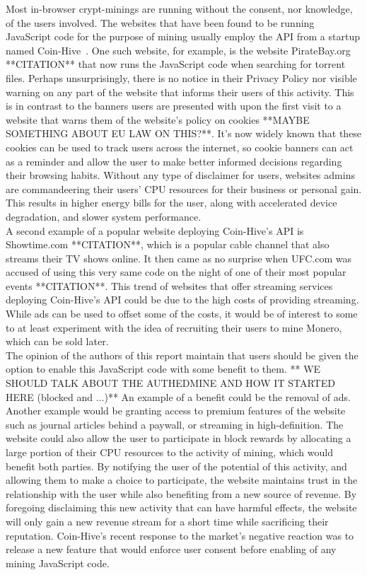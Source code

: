 Most in-browser crypt-minings are running without the consent, nor knowledge, of the users involved. The websites that have been found to be running JavaScript code for the purpose of mining usually employ the API from a startup named Coin-Hive~\cite{coinhive}. One such website, for example, is the website PirateBay.org **CITATION** that now runs the JavaScript code when searching for torrent files. Perhaps unsurprisingly, there is no notice in their Privacy Policy nor visible warning on any part of the website that informs their users of this activity. This is in contrast to the banners users are presented with upon the first visit to a website that warns them of the website’s policy on cookies **MAYBE SOMETHING ABOUT EU LAW ON THIS?**. It’s now widely known that these cookies can be used to track users across the internet, so cookie banners can act as a reminder and allow the user to make better informed decisions regarding their browsing habits. Without any type of disclaimer for users, websites admins are commandeering their users’ CPU resources for their business or personal gain. This results in higher energy bills for the user, along with accelerated device degradation, and slower system performance.
\\
A second example of a popular website deploying Coin-Hive’s API is Showtime.com **CITATION**, which is a popular cable channel that also streams their TV shows online. It then came as no surprise when UFC.com was accused of using this very same code on the night of one of their most popular events **CITATION**. This trend of websites that offer streaming services deploying Coin-Hive’s API could be due to the high costs of providing streaming. While ads can be used to offset some of the costs, it would be of interest to some to at least experiment with the idea of recruiting their users to mine Monero, which can be sold later.
\\
The opinion of the authors of this report maintain that users should be given the option to enable this JavaScript code with some benefit to them. ** WE SHOULD TALK ABOUT THE AUTHEDMINE AND HOW IT STARTED HERE (blocked and ...)** An example of a benefit could be the removal of ads. Another example would be granting access to premium features of the website such as journal articles behind a paywall, or streaming in high-definition. The website could also allow the user to participate in block rewards by allocating a large portion of their CPU resources to the activity of mining, which would benefit both parties. By notifying the user of the potential of this activity, and allowing them to make a choice to participate, the website maintains trust in the relationship with the user while also benefiting from a new source of revenue. By foregoing disclaiming this new activity that can have harmful effects, the website will only gain a new revenue stream for a short time while sacrificing their reputation. Coin-Hive’s recent response to the market’s negative reaction was to release a new feature that would enforce user consent before enabling of any mining JavaScript code. 
